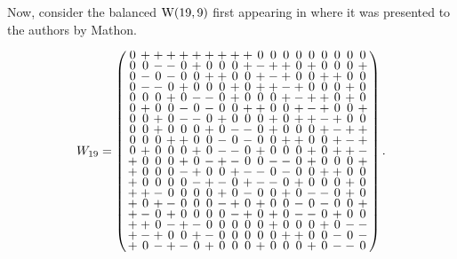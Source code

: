 \documentclass[../../../main]{subfiles}
\begin{document}
 Now, consider the balanced $\text{W}(19,9)$ first appearing in \cite{bgw-19-9-4}
 where it was presented to the authors by Mathon.
 \begin{small}
   \[
     W_{19}=
     \arraycolsep=1.25pt\def\arraystretch{0.625}
     \left(\begin{array}{ccccccccccccccccccc}
             0&+&+&+&+&+&+&+&+&+&0&0&0&0&0&0&0&0&0\\
             0&0&-&-&0&+&0&0&0&+&-&+&+&0&+&0&0&0&+\\
             0&-&0&-&0&0&+&+&0&0&+&-&+&0&0&+&+&0&0\\
             0&-&-&0&+&0&0&0&+&0&+&+&-&+&0&0&0&+&0\\
             0&0&0&+&0&-&-&0&+&0&0&0&+&-&+&+&0&+&0\\
             0&+&0&0&-&0&-&0&0&+&+&0&0&+&-&+&0&0&+\\
             0&0&+&0&-&-&0&+&0&0&0&+&0&+&+&-&+&0&0\\
             0&0&+&0&0&0&+&0&-&-&0&+&0&0&0&+&-&+&+\\
             0&0&0&+&+&0&0&-&0&-&0&0&+&+&0&0&+&-&+\\
             0&+&0&0&0&+&0&-&-&0&+&0&0&0&+&0&+&+&-\\
             +&0&0&0&+&0&-&+&-&0&0&-&-&0&+&0&0&0&+\\
             +&0&0&0&-&+&0&0&+&-&-&0&-&0&0&+&+&0&0\\
             +&0&0&0&0&-&+&-&0&+&-&-&0&+&0&0&0&+&0\\
             +&+&-&0&0&0&0&+&0&-&0&0&+&0&-&-&0&+&0\\
             +&0&+&-&0&0&0&-&+&0&+&0&0&-&0&-&0&0&+\\
             +&-&0&+&0&0&0&0&-&+&0&+&0&-&-&0&+&0&0\\
             +&+&0&-&+&-&0&0&0&0&0&+&0&0&0&+&0&-&-\\
             +&-&+&0&0&+&-&0&0&0&0&0&+&+&0&0&-&0&-\\
             +&0&-&+&-&0&+&0&0&0&+&0&0&0&+&0&-&-&0\\
           \end{array}\right).
       \]
 \end{small}
 
\end{document}
